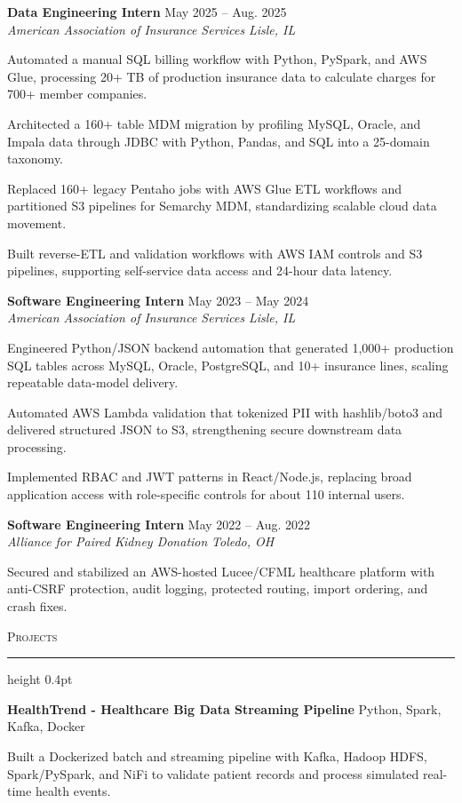 \documentclass[letterpaper,11pt]{article}
\newcommand{\resumesection}[1]{%
  \par\vspace{2pt}%
  {\large\scshape #1}\par\vspace{2pt}%
  \hrule height 0.4pt\vspace{2pt}%
}
\newcommand{\resumeSubheading}[4]{
  \textbf{#1} \hfill #2\\
  \textit{#3} \hfill \textit{#4}
}
\newcommand{\projectHeading}[2]{
  \textbf{#1} \hfill #2
}
\begin{document}
\resumeSubheading
{Data Engineering Intern}{May 2025 -- Aug. 2025}
{American Association of Insurance Services}{Lisle, IL}
\begin{tightitemize}
  \item Automated a manual SQL billing workflow with Python, PySpark, and AWS Glue, processing 20+ TB of production insurance data to calculate charges for 700+ member companies.
  \item Architected a 160+ table MDM migration by profiling MySQL, Oracle, and Impala data through JDBC with Python, Pandas, and SQL into a 25-domain taxonomy.
  \item Replaced 160+ legacy Pentaho jobs with AWS Glue ETL workflows and partitioned S3 pipelines for Semarchy MDM, standardizing scalable cloud data movement.
  \item Built reverse-ETL and validation workflows with AWS IAM controls and S3 pipelines, supporting self-service data access and 24-hour data latency.
\end{tightitemize}

\resumeSubheading
{Software Engineering Intern}{May 2023 -- May 2024}
{American Association of Insurance Services}{Lisle, IL}
\begin{tightitemize}
  \item Engineered Python/JSON backend automation that generated 1,000+ production SQL tables across MySQL, Oracle, PostgreSQL, and 10+ insurance lines, scaling repeatable data-model delivery.
  \item Automated AWS Lambda validation that tokenized PII with hashlib/boto3 and delivered structured JSON to S3, strengthening secure downstream data processing.
  \item Implemented RBAC and JWT patterns in React/Node.js, replacing broad application access with role-specific controls for about 110 internal users.
\end{tightitemize}

\resumeSubheading
{Software Engineering Intern}{May 2022 -- Aug. 2022}
{Alliance for Paired Kidney Donation}{Toledo, OH}
\begin{tightitemize}
  \item Secured and stabilized an AWS-hosted Lucee/CFML healthcare platform with anti-CSRF protection, audit logging, protected routing, import ordering, and crash fixes.
\end{tightitemize}

\resumesection{Projects}
\projectHeading{HealthTrend - Healthcare Big Data Streaming Pipeline}{Python, Spark, Kafka, Docker}
\begin{tightitemize}
  \item Built a Dockerized batch and streaming pipeline with Kafka, Hadoop HDFS, Spark/PySpark, and NiFi to validate patient records and process simulated real-time health events.
\end{tightitemize}
\end{document}
